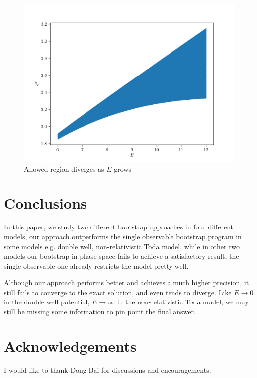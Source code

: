 \documentclass[aps, preprint,amsmath, amssymb]{revtex4-2}
\begin{document}
\begin{figure}
    \includegraphics[width=0.8\linewidth]{todal.png}
    \caption{Allowed region diverges as $E$ grows}
    \label{fig:todal}
\end{figure}

\section{Conclusions}
In this paper, we study two different bootstrap approaches in four different models, our approach outperforms the single observable bootstrap program in some models e.g. double well, non-relativistic Toda model, while in other two models our bootstrap in phase space fails to achieve a satisfactory result, the single observable one already restricts the model pretty well.

Although our approach performs better and achieves a much higher precision, it still fails to converge to the exact solution, and even tends to diverge. Like $E \to 0$ in the double well potential, $E \to \infty$ in the non-relativistic Toda model, we may still be missing some information to pin point the final answer.

\section*{Acknowledgements}
I would like to thank Dong Bai for discussions and encouragements.


\end{document}
